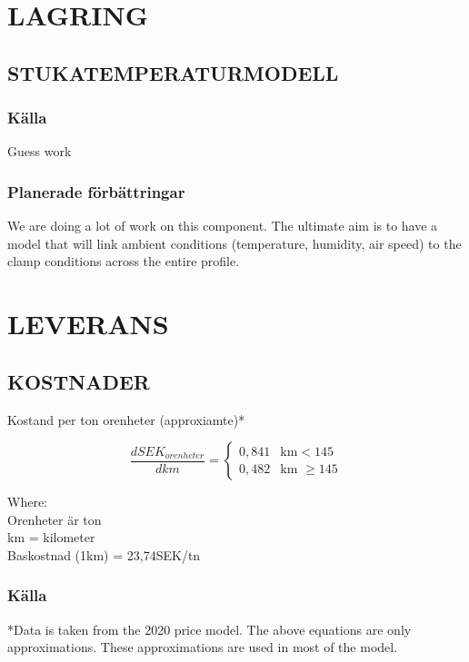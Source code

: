 \documentclass[fleqn]{article}
\begin{document}
\pagebreak
\section{LAGRING}
  
  \subsection{STUKATEMPERATURMODELL}
  
  \subsubsection{Källa}
  Guess work
  
  \subsubsection{Planerade förbättringar}
  We are doing a lot of work on this component. The ultimate aim is to have a model that will link ambient conditions (temperature, humidity, air speed) to the clamp conditions across the entire profile.


\pagebreak
\section{LEVERANS}

  \subsection{KOSTNADER}
  
  Kostand per ton orenheter (approxiamte)*
  
  \begin{equation}
    \frac{dSEK_{orenheter}}{dkm} =
    \begin{cases}
      0,841 & \text{km} < 145\\
      0,482 & \text{km $\geq 145$}
    \end{cases}
  \end{equation}

  Where:\\
  \hangindent=1.5cm
  Orenheter är ton\\
  km = kilometer\\
  Baskostnad (1km) = 23,74SEK/tn
  
  \subsubsection{Källa}
  *Data is taken from the 2020 price model. The above equations are only approximations. These approximations are used in most of the model.
  
\end{document}
